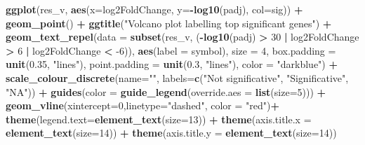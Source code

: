 \documentclass[
  12pt,
]{article}
\newenvironment{Shaded}{\begin{snugshade}}{\end{snugshade}}
\newcommand{\DataTypeTok}[1]{\textcolor[rgb]{0.13,0.29,0.53}{#1}}
\newcommand{\DecValTok}[1]{\textcolor[rgb]{0.00,0.00,0.81}{#1}}
\newcommand{\FloatTok}[1]{\textcolor[rgb]{0.00,0.00,0.81}{#1}}
\newcommand{\KeywordTok}[1]{\textcolor[rgb]{0.13,0.29,0.53}{\textbf{#1}}}
\newcommand{\NormalTok}[1]{#1}
\newcommand{\OperatorTok}[1]{\textcolor[rgb]{0.81,0.36,0.00}{\textbf{#1}}}
\newcommand{\StringTok}[1]{\textcolor[rgb]{0.31,0.60,0.02}{#1}}
\begin{document}
\begin{Shaded}
\begin{Highlighting}[]
{{{{{{\KeywordTok{ggplot}\NormalTok{(res_v, }\KeywordTok{aes}\NormalTok{(}\DataTypeTok{x=}\NormalTok{log2FoldChange, }\DataTypeTok{y=}\OperatorTok{-}\KeywordTok{log10}\NormalTok{(padj), }\DataTypeTok{col=}\NormalTok{sig)) }\OperatorTok{+}
\StringTok{  }\KeywordTok{geom_point}\NormalTok{() }\OperatorTok{+}
\StringTok{  }\KeywordTok{ggtitle}\NormalTok{(}\StringTok{"Volcano plot labelling top significant genes"}\NormalTok{) }\OperatorTok{+}
\StringTok{  }\KeywordTok{geom_text_repel}\NormalTok{(}\DataTypeTok{data =} \KeywordTok{subset}\NormalTok{(res_v, (}\OperatorTok{-}\KeywordTok{log10}\NormalTok{(padj) }\OperatorTok{>}\StringTok{ }\DecValTok{30} \OperatorTok{|}\StringTok{ }
\StringTok{                                          }\NormalTok{log2FoldChange }\OperatorTok{>}\StringTok{ }\DecValTok{6} \OperatorTok{|}\StringTok{ }
\StringTok{                                          }\NormalTok{log2FoldChange }\OperatorTok{<}\StringTok{ }\DecValTok{-6}\NormalTok{)),}
                  \KeywordTok{aes}\NormalTok{(}\DataTypeTok{label =}\NormalTok{ symbol),}
                  \DataTypeTok{size =} \DecValTok{4}\NormalTok{,}
                  \DataTypeTok{box.padding =} \KeywordTok{unit}\NormalTok{(}\FloatTok{0.35}\NormalTok{, }\StringTok{"lines"}\NormalTok{),}
                  \DataTypeTok{point.padding =} \KeywordTok{unit}\NormalTok{(}\FloatTok{0.3}\NormalTok{, }\StringTok{"lines"}\NormalTok{), }\DataTypeTok{color =} \StringTok{"darkblue"}\NormalTok{) }\OperatorTok{+}
\StringTok{  }\KeywordTok{scale_colour_discrete}\NormalTok{(}\DataTypeTok{name=}\StringTok{""}\NormalTok{,}
                        \DataTypeTok{labels=}\KeywordTok{c}\NormalTok{(}\StringTok{"Not significative"}\NormalTok{, }\StringTok{"Significative"}\NormalTok{, }\StringTok{"NA"}\NormalTok{)) }\OperatorTok{+}
\StringTok{  }\KeywordTok{guides}\NormalTok{(}\DataTypeTok{color =} \KeywordTok{guide_legend}\NormalTok{(}\DataTypeTok{override.aes =} \KeywordTok{list}\NormalTok{(}\DataTypeTok{size=}\DecValTok{5}\NormalTok{))) }\OperatorTok{+}
\StringTok{  }\KeywordTok{geom_vline}\NormalTok{(}\DataTypeTok{xintercept=}\DecValTok{0}\NormalTok{,}\DataTypeTok{linetype=}\StringTok{"dashed"}\NormalTok{, }\DataTypeTok{color =} \StringTok{"red"}\NormalTok{)}\OperatorTok{+}
\StringTok{  }\KeywordTok{theme}\NormalTok{(}\DataTypeTok{legend.text=}\KeywordTok{element_text}\NormalTok{(}\DataTypeTok{size=}\DecValTok{13}\NormalTok{)) }\OperatorTok{+}
\StringTok{  }\KeywordTok{theme}\NormalTok{(}\DataTypeTok{axis.title.x =} \KeywordTok{element_text}\NormalTok{(}\DataTypeTok{size=}\DecValTok{14}\NormalTok{)) }\OperatorTok{+}
\StringTok{  }\KeywordTok{theme}\NormalTok{(}\DataTypeTok{axis.title.y =} \KeywordTok{element_text}\NormalTok{(}\DataTypeTok{size=}\DecValTok{14}\NormalTok{))}

}}}}}}
\end{Highlighting}
\end{Shaded}
\end{document}
